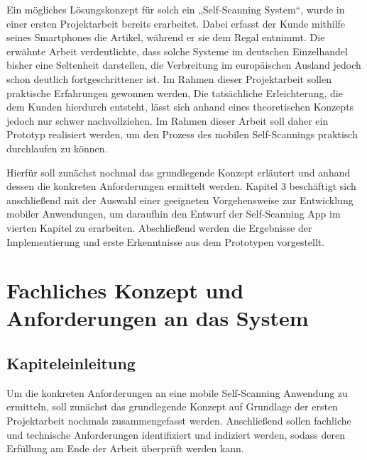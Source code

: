 Ein mögliches Lösungskonzept für solch ein „Self-Scanning System“, wurde in einer ersten Projektarbeit bereits erarbeitet. Dabei erfasst der Kunde mithilfe seines Smartphones die Artikel, während er sie dem Regal entnimmt. Die erwähnte Arbeit verdeutlichte, dass solche Systeme im deutschen Einzelhandel bisher eine Seltenheit darstellen, die Verbreitung im europäischen Ausland jedoch schon deutlich fortgeschrittener ist. Im Rahmen dieser Projektarbeit sollen praktische Erfahrungen gewonnen werden, Die tatsächliche Erleichterung, die dem Kunden hierdurch entsteht, lässt sich anhand eines theoretischen Konzepts jedoch nur schwer nachvollziehen. Im Rahmen dieser Arbeit soll daher ein Prototyp realisiert werden, um den Prozess des mobilen Self-Scannings praktisch durchlaufen zu können.

Hierfür soll zunächst nochmal das grundlegende Konzept erläutert und anhand dessen die konkreten Anforderungen ermittelt werden. Kapitel 3 beschäftigt sich anschließend mit der Auswahl einer geeigneten Vorgehensweise zur Entwicklung mobiler Anwendungen, um daraufhin den Entwurf der Self-Scanning App im vierten Kapitel zu erarbeiten. Abschließend werden die Ergebnisse der Implementierung und erste Erkenntnisse aus dem Prototypen vorgestellt.


\chapter{Fachliches Konzept und Anforderungen an das System}
\section{Kapiteleinleitung}
Um die konkreten Anforderungen an eine mobile Self-Scanning Anwendung zu ermitteln, soll zunächst das grundlegende Konzept auf Grundlage der ersten Projektarbeit nochmals zusammengefasst werden. Anschließend sollen fachliche und technische Anforderungen identifiziert und indiziert werden, sodass deren Erfüllung am Ende der Arbeit überprüft werden kann.


